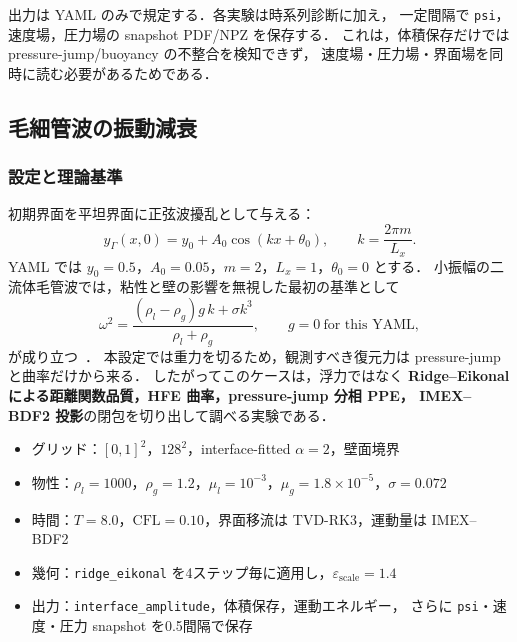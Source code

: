 出力は YAML のみで規定する．各実験は時系列診断に加え，
一定間隔で \texttt{psi}，速度場，圧力場の snapshot PDF/NPZ を保存する．
これは，体積保存だけでは pressure-jump/buoyancy の不整合を検知できず，
速度場・圧力場・界面場を同時に読む必要があるためである．

\subsection{毛細管波の振動減衰}
\label{sec:val_capillary}

\subsubsection{設定と理論基準}

初期界面を平坦界面に正弦波擾乱として与える：
\begin{equation}
  y_\Gamma(x,0)=y_0 + A_0\cos(kx+\theta_0),
  \qquad
  k=\frac{2\pi m}{L_x}.
  \label{eq:capillary_wave_initial}
\end{equation}
YAML では $y_0=0.5$，$A_0=0.05$，$m=2$，$L_x=1$，$\theta_0=0$ とする．
小振幅の二流体毛管波では，粘性と壁の影響を無視した最初の基準として
\begin{equation}
  \omega^2
  = \frac{(\rho_l-\rho_g)g\,k+\sigma k^3}{\rho_l+\rho_g},
  \qquad
  g=0 \ \text{for this YAML},
  \label{eq:flat_capillary_dispersion}
\end{equation}
が成り立つ~\cite{Prosperetti1981}．
本設定では重力を切るため，観測すべき復元力は pressure-jump と曲率だけから来る．
したがってこのケースは，浮力ではなく
\textbf{Ridge--Eikonal による距離関数品質，HFE 曲率，pressure-jump 分相 PPE，
IMEX--BDF2 投影}の閉包を切り出して調べる実験である．

\begin{itemize}[noitemsep,leftmargin=2em]
  \item グリッド：$[0,1]^2$，$128^2$，interface-fitted $\alpha=2$，壁面境界
  \item 物性：$\rho_l=1000$，$\rho_g=1.2$，$\mu_l=10^{-3}$，$\mu_g=1.8\times10^{-5}$，$\sigma=0.072$
  \item 時間：$T=8.0$，$\mathrm{CFL}=0.10$，界面移流は TVD-RK3，運動量は IMEX--BDF2
  \item 幾何：\texttt{ridge\_eikonal} を4ステップ毎に適用し，$\varepsilon_\text{scale}=1.4$
  \item 出力：\texttt{interface\_amplitude}，体積保存，運動エネルギー，
        さらに \texttt{psi}・速度・圧力 snapshot を0.5間隔で保存
\end{itemize}


